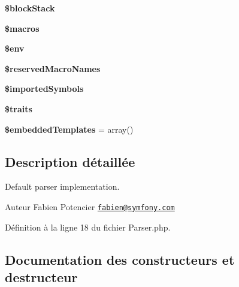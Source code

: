 \begin{DoxyCompactItemize}
\item 
{\bfseries \$block\+Stack}\hypertarget{class_twig___parser_a05fa28125b038667e94644c471349750}{}\label{class_twig___parser_a05fa28125b038667e94644c471349750}

\item 
{\bfseries \$macros}\hypertarget{class_twig___parser_aa11dc0c9db28ed82b4e1a0efb656d120}{}\label{class_twig___parser_aa11dc0c9db28ed82b4e1a0efb656d120}

\item 
{\bfseries \$env}\hypertarget{class_twig___parser_aa99ce9ae015e958eef5782267276fbb4}{}\label{class_twig___parser_aa99ce9ae015e958eef5782267276fbb4}

\item 
{\bfseries \$reserved\+Macro\+Names}\hypertarget{class_twig___parser_aa271e96833c2965e222ef74168ca0bf7}{}\label{class_twig___parser_aa271e96833c2965e222ef74168ca0bf7}

\item 
{\bfseries \$imported\+Symbols}\hypertarget{class_twig___parser_aa7287b45ead87d8a30921a0113a0525e}{}\label{class_twig___parser_aa7287b45ead87d8a30921a0113a0525e}

\item 
{\bfseries \$traits}\hypertarget{class_twig___parser_a00d691d7d5290df7d075c00deb62dd1b}{}\label{class_twig___parser_a00d691d7d5290df7d075c00deb62dd1b}

\item 
{\bfseries \$embedded\+Templates} = array()\hypertarget{class_twig___parser_a2c012e7ba55075c0a5251a60dff8d483}{}\label{class_twig___parser_a2c012e7ba55075c0a5251a60dff8d483}

\end{DoxyCompactItemize}


\subsection{Description détaillée}
Default parser implementation.

\begin{DoxyAuthor}{Auteur}
Fabien Potencier \href{mailto:fabien@symfony.com}{\tt fabien@symfony.\+com} 
\end{DoxyAuthor}


Définition à la ligne 18 du fichier Parser.\+php.



\subsection{Documentation des constructeurs et destructeur}

